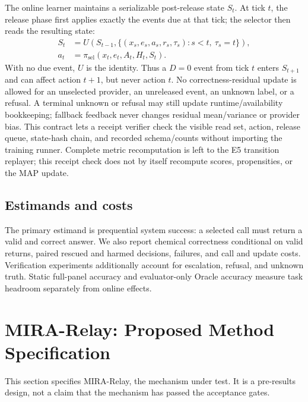 \documentclass[sigconf,anonymous]{aamas}
\begin{document}
The online learner maintains a serializable post-release state $S_t$. At tick $t$, the release phase first applies exactly the events due at that tick; the selector then reads the resulting state:
$$
\begin{aligned}
S_t&=U\left(S_{t-1},\{(x_s,e_s,a_s,r_s,\tau_s):s<t,\ \tau_s=t\}\right),\\
a_t&=\pi_{\mathrm{sel}}(x_t,e_t,A_t,H_t,S_t).
\end{aligned}
$$
With no due event, $U$ is the identity. Thus a $D=0$ event from tick $t$ enters $S_{t+1}$ and can affect action $t+1$, but never action $t$.
No correctness-residual update is allowed for an unselected provider, an unreleased event, an unknown label, or a refusal. A terminal unknown or refusal may still update runtime/availability bookkeeping; fallback feedback never changes residual mean/variance or provider bias. This contract lets a receipt verifier check the visible read set, action, release queue, state-hash chain, and recorded schema/counts without importing the training runner. Complete metric recomputation is left to the E5 transition replayer; this receipt check does not by itself recompute scores, propensities, or the MAP update.

\subsection{Estimands and costs}
The primary estimand is prequential system success: a selected call must return a valid and correct answer. We also report chemical correctness conditional on valid returns, paired rescued and harmed decisions, failures, and call and update costs. Verification experiments additionally account for escalation, refusal, and unknown truth. Static full-panel accuracy and evaluator-only Oracle accuracy measure task headroom separately from online effects.

\section{MIRA-Relay: Proposed Method Specification}
This section specifies MIRA-Relay, the mechanism under test. It is a pre-results design, not a claim that the mechanism has passed the acceptance gates.
\end{document}
